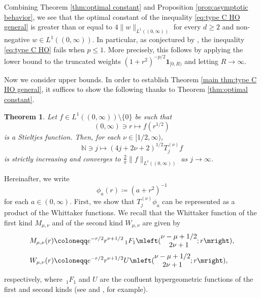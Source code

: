 \documentclass[reqno]{amsart}
\theoremstyle{plain}
\newtheorem{theorem}{Theorem}[section]
\numberwithin{equation}{section}
\theoremstyle{remark}
\newcommand{\N}{\mathbb{N}}
\newcommand{\indicator}[1]{\mathbf{1}_{#1}}
\newcommand{\intervaloo}[2]{(#1, #2)}
\newcommand{\intervalco}[2]{[#1, #2)}
\newcommand{\norm}[1]{\lVert#1\rVert}
\newcommand{\Tjnuf}[3]{T_{#1}^{(#2)}#3}
\newcommand{\hypergeometricpFq}[5]{ \,{}_{#1} F_{#2}\mleft( \begin{matrix}
		#3 \\
		#4
	\end{matrix} ; #5 \mright)  }
\newcommand{\hypergeometricU}[3]{U\mleft( \begin{matrix}
		#1 \\
		#2
	\end{matrix} ; #3 \mright)}
\newcommand{\hypergeometricpFqNoArgument}[2]{ \,{}_{#1} F_{#2} }
\newcommand{\hypergeometricUNoArgument}{U}
\newcommand{\WhittakerM}[2]{M_{#1, #2}}
\newcommand{\WhittakerW}[2]{W_{#1, #2}}
\newcommand{\weightphia}[1]{\phi_{#1}}
\begin{document}
Combining Theorem \ref{thm:optimal constant} and Proposition \ref{prop:asymptotic behavior}, we see that the optimal constant of the inequality \eqref{eq:type C HO general} is greater than or equal to $4\norm{w}_{L^1(\intervaloo{0}{\infty})}$ for every $d \geq 2$ and non-negative $w \in L^1(\intervaloo{0}{\infty})$.
In particular, as conjectured by \citet{BR2011}, the inequality \eqref{eq:type C HO} fails when $p \leq 1$.
More precisely, this follows by applying the lower bound to the truncated weights
$(1+r^2)^{-p/2} \indicator{\intervalco{0}{R}}$ and letting $R \to \infty$.

Now we consider upper bounds. In order to establish Theorem \ref{main thm:type C HO general}, it suffices to show the following thanks to Theorem \ref{thm:optimal constant}.
\begin{theorem} \label{thm:monotonicity for Stieltjes weights}
Let $f \in L^1(\intervaloo{0}{\infty}) \setminus \{0\}$ be such that 
\begin{equation}
\intervaloo{0}{\infty} \ni r \longmapsto f(r^{1/2})
\end{equation}
is a Stieltjes function.
Then, for each $\nu \in \intervalco{1/2}{\infty}$,
\begin{equation}
\N \ni j \longmapsto (4j+2\nu+2)^{1/2} \Tjnuf{j}{\nu}{f} 
\end{equation}
is strictly increasing and converges to $\frac{2}{\pi} \norm{f}_{L^1(\intervaloo{0}{\infty})}$ as $j \to \infty$.
\end{theorem}
Hereinafter, we write
\begin{equation}
	\weightphia{a}(r) \coloneqq (a + r^2)^{-1} 
\end{equation}
for each $a \in \intervaloo{0}{\infty}$. 
First, we show that $\Tjnuf{j}{\nu}{\weightphia{a}}$ can be represented as a product of the Whittaker functions.
We recall that the Whittaker function of the first kind $\WhittakerM{\mu}{\nu}$ and of the second kind $\WhittakerW{\mu}{\nu}$ are given by
\begin{align}
	\WhittakerM{\mu}{\nu}(r) &\coloneqq e^{-r/2} r^{\nu+1/2} \hypergeometricpFq{1}{1}{\nu-\mu+1/2}{2\nu+1}{r} , 
	\label{eq:WhittakerM}\\
	\WhittakerW{\mu}{\nu}(r) &\coloneqq e^{-r/2} r^{\nu+1/2} \hypergeometricU{\nu-\mu+1/2}{2\nu+1}{r} ,  
	\label{eq:WhittakerW}
\end{align}
respectively, where $\hypergeometricpFqNoArgument{1}{1}$ and $\hypergeometricUNoArgument$ are the confluent hypergeometric functions of the first and second kinds (see \cite[\href{https://dlmf.nist.gov/13\#PT3}{13.14--13.26}]{DLMF} and \cite[9.22--9.23]{GR2014}, for example).
\end{document}
